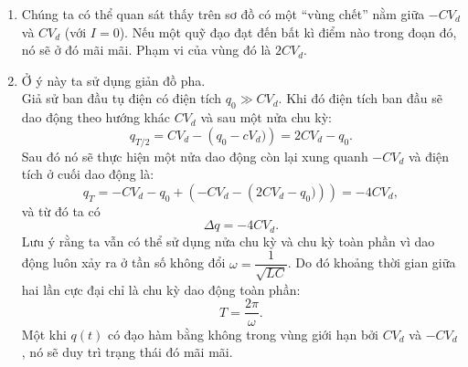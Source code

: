 \begin{loigiai}
\begin{enumerate}[1)]
\begin{center}
        \end{center}
        \item Chúng ta có thể quan sát thấy trên sơ đồ có một “vùng chết” nằm giữa $-CV_d$ và $CV_d$ (với $I = 0$). Nếu một quỹ đạo đạt đến bất kì điểm nào trong đoạn đó, nó sẽ ở đó mãi mãi. Phạm vi của vùng đó là $2CV_d$.
        \item Ở ý này ta sử dụng giản đồ pha.
        \\Giả sử ban đầu tụ điện có điện tích $q_0 \gg CV_d$. Khi đó điện tích ban đầu sẽ dao động theo hướng khác $CV_d$ và sau một nửa chu kỳ: $$q_{T/2}=CV_d-\left(q_0-cV_d)\right)=2CV_d-q_0.$$
        Sau đó nó sẽ thực hiện một nửa dao động còn lại xung quanh $-CV_d$ và điện tích ở cuối dao động là:
        $$q_T=-CV_d-q_0+\left(-CV_d-\left(2CV_d-q_0)\right)\right)=-4CV_d,$$
        và từ đó ta có
        $$\Delta q=-4CV_d.$$
        Lưu ý rằng ta vẫn có thể sử dụng nửa chu kỳ và chu kỳ toàn phần vì dao động luôn xảy ra ở tần số không đổi $\omega=\dfrac{1}{\sqrt{LC}}$. Do đó khoảng thời gian giữa hai lần cực đại chỉ là chu kỳ dao động toàn phần:
        $$T=\dfrac{2\pi}{\omega}.$$
        Một khi $q(t)$ có đạo hàm bằng không trong vùng giới hạn bởi $CV_d$ và $-CV_d$, nó sẽ duy trì trạng thái đó mãi mãi.
    \end{enumerate}
\end{loigiai}


